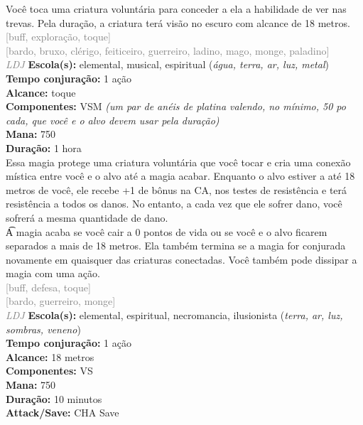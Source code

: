 \documentclass{RPG_Adventure}[2021/10/20]
\begin{document}
{\normalsize Você toca uma criatura voluntária para conceder a ela a habilidade de ver nas trevas. Pela duração, a criatura terá visão no escuro com alcance de 18 metros.\\}
{\scriptsize \textcolor{gray}{[buff, exploração, toque]\\}}
{\scriptsize \textcolor{gray}{[bardo, bruxo, clérigo, feiticeiro, guerreiro, ladino, mago, monge, paladino]\\}}
{\tiny \textcolor{gray}{\textit{LDJ}}}
{\small \t \textbf{Escola(s):} elemental, musical, espiritual (\textit{água, terra, ar, luz, metal})\\\t \textbf{Tempo conjuração:} 1 ação\\\t \textbf{Alcance:} toque\\\t \textbf{Componentes:} VSM \textit{(um par de anéis de platina valendo, no mínimo, 50 po cada, que você e o alvo devem usar pela duração)}\\\t \textbf{Mana:} 750\\\t \textbf{Duração:} 1 hora\\}
{\normalsize Essa magia protege uma criatura voluntária que você tocar e cria uma conexão mística entre você e o alvo até a magia acabar. Enquanto o alvo estiver a até 18 metros de você, ele recebe +1 de bônus na CA, nos testes de resistência e terá resistência a todos os danos. No entanto, a cada vez que ele sofrer dano, você sofrerá a mesma quantidade de dano.\\\t A magia acaba se você cair a 0 pontos de vida ou se você e o alvo ficarem separados a mais de 18 metros. Ela também termina se a magia for conjurada novamente em quaisquer das criaturas conectadas. Você também pode dissipar a magia com uma ação.\\}
{\scriptsize \textcolor{gray}{[buff, defesa, toque]\\}}
{\scriptsize \textcolor{gray}{[bardo, guerreiro, monge]\\}}
{\tiny \textcolor{gray}{\textit{LDJ}}}
{\small \t \textbf{Escola(s):} elemental, espiritual, necromancia, ilusionista (\textit{terra, ar, luz, sombras, veneno})\\\t \textbf{Tempo conjuração:} 1 ação\\\t \textbf{Alcance:} 18 metros\\\t \textbf{Componentes:} VS\\\t \textbf{Mana:} 750\\\t \textbf{Duração:} 10 minutos\\\t \textbf{Attack/Save:} CHA Save\\}
\end{document}
